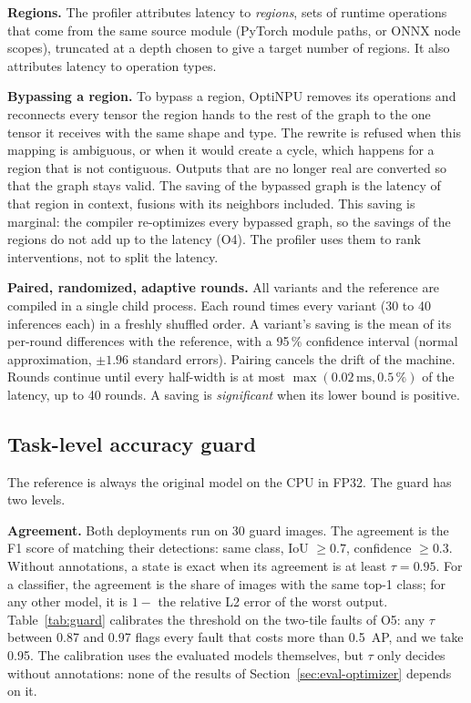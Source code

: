 \documentclass[conference]{IEEEtran}
\newcommand{\tool}{OptiNPU}
\newcommand{\ms}{\,\text{ms}}
\begin{document}
\textbf{Regions.} The profiler attributes latency to \emph{regions}, sets of runtime operations that come from the same source module (PyTorch module paths, or ONNX node scopes), truncated at a depth chosen to give a target number of regions. It also attributes latency to operation types.

\textbf{Bypassing a region.} To bypass a region, \tool{} removes its operations and reconnects every tensor the region hands to the rest of the graph to the one tensor it receives with the same shape and type. The rewrite is refused when this mapping is ambiguous, or when it would create a cycle, which happens for a region that is not contiguous. Outputs that are no longer real are converted so that the graph stays valid. The saving of the bypassed graph is the latency of that region in context, fusions with its neighbors included. This saving is marginal: the compiler re-optimizes every bypassed graph, so the savings of the regions do not add up to the latency (O4). The profiler uses them to rank interventions, not to split the latency.

\textbf{Paired, randomized, adaptive rounds.} All variants and the reference are compiled in a single child process. Each round times every variant (30 to 40 inferences each) in a freshly shuffled order. A variant's saving is the mean of its per-round differences with the reference, with a 95\,\% confidence interval (normal approximation, $\pm 1.96$ standard errors). Pairing cancels the drift of the machine. Rounds continue until every half-width is at most $\max(0.02\ms, 0.5\,\%)$ of the latency, up to 40 rounds. A saving is \emph{significant} when its lower bound is positive.

\subsection{Task-level accuracy guard}
\label{sec:guard}

The reference is always the original model on the CPU in FP32. The guard has two levels.

\textbf{Agreement.} Both deployments run on 30 guard images. The agreement is the F1 score of matching their detections: same class, IoU $\geq 0.7$, confidence $\geq 0.3$. Without annotations, a state is exact when its agreement is at least $\tau = 0.95$. For a classifier, the agreement is the share of images with the same top-1 class; for any other model, it is $1 -$ the relative L2 error of the worst output. Table~\ref{tab:guard} calibrates the threshold on the two-tile faults of O5: any $\tau$ between 0.87 and 0.97 flags every fault that costs more than 0.5~AP, and we take 0.95. The calibration uses the evaluated models themselves, but $\tau$ only decides without annotations: none of the results of Section~\ref{sec:eval-optimizer} depends on it.
\end{document}
